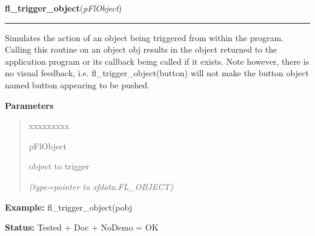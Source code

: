 \hspace{.8\funcindent}\begin{boxedminipage}{\funcwidth}

    \raggedright \textbf{fl\_trigger\_object}(\textit{pFlObject})

    \vspace{-1.5ex}

    \rule{\textwidth}{0.5\fboxrule}
\setlength{\parskip}{2ex}
    Simulates the action of an object being triggered from within the 
    program. Calling this routine on an object obj results in the object 
    returned to the application program or its callback being called if it 
    exists. Note however, there is no visual feedback, i.e. 
    fl\_trigger\_object(button) will not make the button object named 
    button appearing to be pushed.

\setlength{\parskip}{1ex}
      \textbf{Parameters}
      \vspace{-1ex}

      \begin{quote}
        \begin{Ventry}{xxxxxxxxx}

          \item[pFlObject]

          object to trigger

            {\it (type=pointer to xfdata.FL\_OBJECT)}

        \end{Ventry}

      \end{quote}

\textbf{Example:} fl\_trigger\_object(pobj



\textbf{Status:} Tested + Doc + NoDemo = OK



    \end{boxedminipage}

    \label{xformslib:flbasic:fl_activate_object}

    \vspace{0.5ex}

